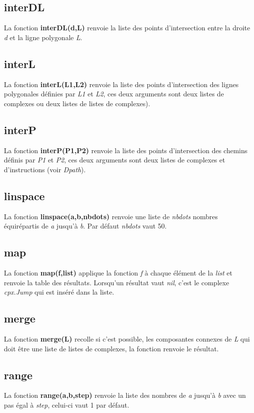 \documentclass[%
10pt,%
a4paper,%
french,%
]%
{article}%
\begin{document}
\subsection{interDL}
La fonction \textbf{interDL(d,L)} renvoie la liste des points d'intersection entre la droite \emph{d} et la ligne polygonale \emph{L}.

\subsection{interL}
La fonction \textbf{interL(L1,L2)} renvoie la liste des points d'intersection des lignes polygonales définies par \emph{L1} et \emph{L2}, ces deux arguments sont deux listes de complexes ou deux listes de listes de complexes).

\subsection{interP}
La fonction \textbf{interP(P1,P2)} renvoie la liste des points d'intersection des chemins définis par \emph{P1} et \emph{P2}, ces deux arguments sont deux listes de complexes et d'instructions (voir \emph{Dpath}).

\subsection{linspace}
La fonction \textbf{linspace(a,b,nbdots)} renvoie une liste de \emph{nbdots} nombres équirépartis de \emph{a} jusqu'à \emph{b}. Par défaut \emph{nbdots} vaut 50.

\subsection{map}
La fonction \textbf{map(f,list)} applique la fonction \emph{f} à chaque élément de la \emph{list} et renvoie la table des résultats. Lorsqu'un résultat vaut \emph{nil}, c'est le complexe \emph{cpx.Jump} qui est inséré dans la liste.

\subsection{merge}
La fonction \textbf{merge(L)} recolle si c'est possible, les composantes connexes de \emph{L} qui doit être une liste de listes de complexes, la fonction renvoie le résultat.

\subsection{range}
La fonction \textbf{range(a,b,step)} renvoie la liste des nombres de \emph{a} jusqu'à \emph{b} avec un pas égal à \emph{step}, celui-ci vaut 1 par défaut.
\end{document}

